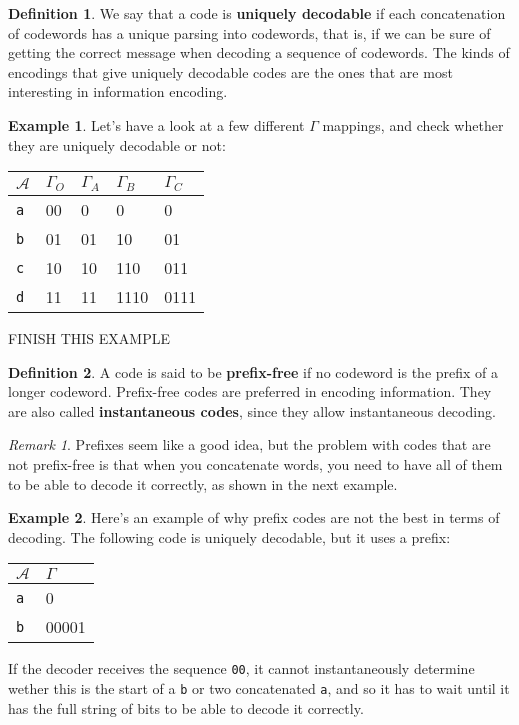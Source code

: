 \documentclass{article}
\theoremstyle{plain}
\theoremstyle{definition}
\newtheorem{exmp}{Example}
\newtheorem{defn}{Definition}
\theoremstyle{remark}
\newtheorem*{remark}{Remark}
\begin{document}
\begin{defn}
	We say that a code is \textbf{uniquely decodable} if each concatenation of codewords has a unique parsing into codewords, that is, if we can be sure of getting the correct message when decoding a sequence of codewords. The kinds of encodings that give uniquely decodable codes are the ones that are most interesting in information encoding. 
\end{defn}

\begin{exmp}
Let's have a look at a few different $\Gamma$ mappings, and check whether they are uniquely decodable or not:
\begin{center}
	\begin{tabular}{l | l l l l}
		$\mathcal A$ & $\Gamma_O$ & $\Gamma_A$ & $\Gamma_B$ & $\Gamma_C$ \\ \hline
		\texttt a & 00 & 0 & 0 & 0 \\
		\texttt b & 01 & 01 & 10 & 01 \\
		\texttt c & 10 & 10 & 110 & 011 \\
		\texttt d & 11 & 11 & 1110 & 0111
	\end{tabular}
\end{center}
FINISH THIS EXAMPLE
\end{exmp}

\begin{defn}
	A code is said to be \textbf{prefix-free} if no codeword is the prefix of a longer codeword. Prefix-free codes are preferred in encoding information. They are also called \textbf{instantaneous codes}, since they allow instantaneous decoding.
\end{defn}
\begin{remark} Prefixes seem like a good idea, but the problem with codes that are not prefix-free is that when you concatenate words, you need to have all of them to be able to decode it correctly, as shown in the next example.
\end{remark}

\begin{exmp} Here's an example of why prefix codes are not the best in terms of decoding. The following code is uniquely decodable, but it uses a prefix:
\begin{center}
	\begin{tabular}{l | l} 
		$\mathcal A$ & $\Gamma$ \\ \hline
		\texttt a & 0 \\
		\texttt b & 00001
	\end{tabular}
\end{center}
If the decoder receives the sequence \texttt{00}, it cannot instantaneously determine wether this is the start of a \texttt{b} or two concatenated \texttt{a}, and so it has to wait until it has the full string of bits to be able to decode it correctly.
\end{exmp}
\end{document}
